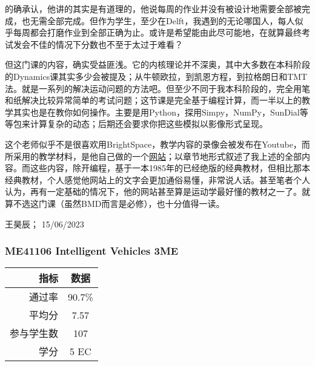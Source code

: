 的确承认，他讲的其实是有道理的，他说每周的作业并没有被设计地需要全部被完成，也无需全部完成。但作为学生，至少在Delft，我遇到的无论哪国人，每人似乎每周都会打磨作业到全部正确为止。或许是希望能由此尽可能地，在就算最终考试发会不佳的情况下分数也不至于太过于难看？

但这门课的内容，确实受益匪浅。它的内核理论并不深奥，其中大多数在本科阶段的Dynamics课其实多少会被提及；从牛顿欧拉，到凯恩方程，到拉格朗日和TMT法。就是一系列的解决运动问题的方法吧。但至少不同于我本科阶段的，完全用笔和纸解决比较异常简单的考试问题；这节课是完全基于编程计算，而一半以上的教学其实也是在教你如何操作。主要是用Python，探用Simpy，NumPy，SunDial等等包来计算复杂的动态；后期还会要求你把这些模拟以影像形式呈现。

这个老师似乎不是很喜欢用BrightSpace，教学内容的录像会被发布在Youtube，而所采用的教学材料，是他自己做的一个\href{https://moorepants.github.io/learn-multibody-dynamics/}{\uline{网站}}；以章节地形式叙述了我上述的全部内容。而这些内容，除开编程，基于一本1985年的已经绝版的经典教材，但相比那本经典教材，个人感觉他网站上的文字会更加通俗易懂，非常说人话。甚至笔者个人认为，再有一定基础的情况下，他的网站甚至算是运动学最好懂的教材之一了。就算不选这门课（虽然BMD而言是必修），也十分值得一读。
\begin{flushright}
王昊辰； 15/06/2023
\end{flushright}

\subsubsection{ME41106 Intelligent Vehicles 3ME}
\begin{minipage}{0.45\textwidth}
\centering
{}
\end{minipage}%
\begin{minipage}{0.45\textwidth}
\raggedleft
\begin{tabular}{r|c}
\textbf{指标} & \textbf{数据} \\ \hline
通过率 & 90.7\% \\ 
平均分 & 7.57 \\ 
参与学生数 & 107 \\ 
学分 & 5 EC\\
\end{tabular}
\end{minipage}\\

